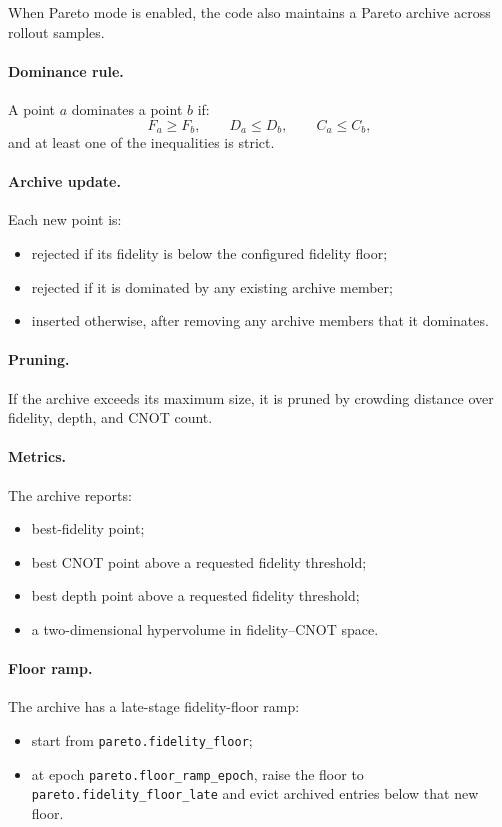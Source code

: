 \documentclass[11pt]{article}
\begin{document}
When Pareto mode is enabled, the code also maintains a Pareto archive across rollout samples.

\paragraph{Dominance rule.}
A point $a$ dominates a point $b$ if:
\[
F_a \ge F_b, \qquad D_a \le D_b, \qquad C_a \le C_b,
\]
and at least one of the inequalities is strict.

\paragraph{Archive update.}
Each new point is:
\begin{itemize}[leftmargin=*]
\item rejected if its fidelity is below the configured fidelity floor;
\item rejected if it is dominated by any existing archive member;
\item inserted otherwise, after removing any archive members that it dominates.
\end{itemize}

\paragraph{Pruning.}
If the archive exceeds its maximum size, it is pruned by crowding distance over fidelity, depth, and CNOT count.

\paragraph{Metrics.}
The archive reports:
\begin{itemize}[leftmargin=*]
\item best-fidelity point;
\item best CNOT point above a requested fidelity threshold;
\item best depth point above a requested fidelity threshold;
\item a two-dimensional hypervolume in fidelity--CNOT space.
\end{itemize}

\paragraph{Floor ramp.}
The archive has a late-stage fidelity-floor ramp:
\begin{itemize}[leftmargin=*]
\item start from \texttt{pareto.fidelity\_floor};
\item at epoch \texttt{pareto.floor\_ramp\_epoch}, raise the floor to \texttt{pareto.fidelity\_floor\_late} and evict archived entries below that new floor.
\end{itemize}
\end{document}
